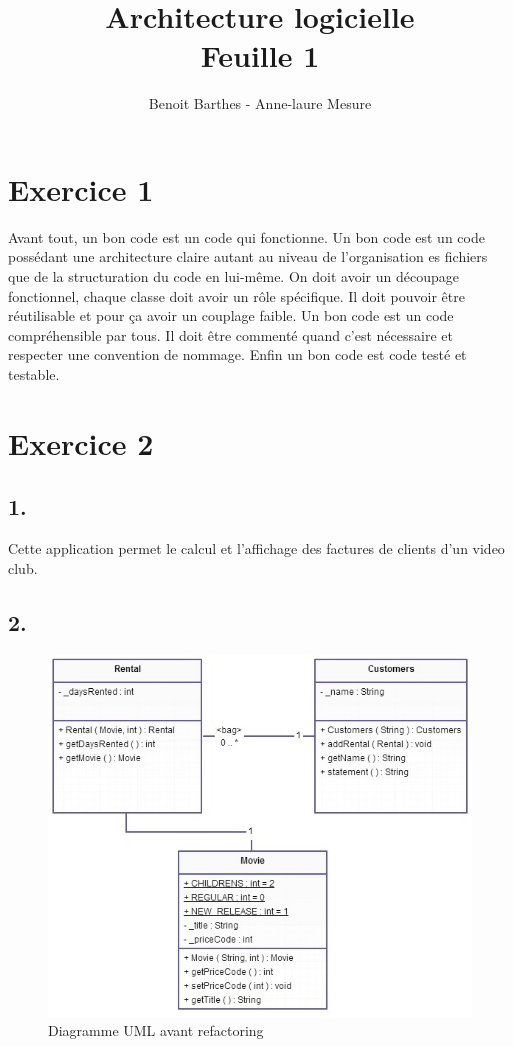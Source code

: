 \documentclass[%
a4paper,
11pt
]{article}
\begin{document}
\title{Architecture logicielle \\ Feuille 1}
\author{Benoit Barthes - Anne-laure Mesure}
\maketitle

\section*{Exercice 1}
Avant tout, un bon code est un code qui fonctionne.
Un bon code est un code possédant une architecture claire autant au niveau de l'organisation es fichiers que de la structuration du code en lui-même. On doit avoir un découpage fonctionnel, chaque classe doit avoir un rôle spécifique. Il doit pouvoir être réutilisable et pour ça avoir un couplage faible.
Un bon code est un code compréhensible par tous. Il doit être commenté quand c'est nécessaire et respecter une convention de nommage.
Enfin un bon code est code testé et testable.

\section*{Exercice 2}
\subsection*{1.}
Cette application permet le calcul et l'affichage des factures de clients d'un video club.
\newpage

\subsection*{2.}
\begin{figure}[!ht]
    \center
    \includegraphics[]{imgs/F1EX2-2.jpg}
    \caption{Diagramme UML avant refactoring}
\end{figure}
\end{document}
